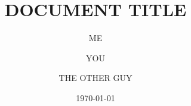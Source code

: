 \documentclass[
    usenglish,
    a4paper,
]{article}
\title{
    DOCUMENT TITLE
}
\author{
    ME
    \and YOU
    \and THE OTHER GUY
}
\date{\today}
\begin{document}
\maketitle



\printglossaries

\printbibliography[]

\listoftodos


\documenthistory
\end{document}
